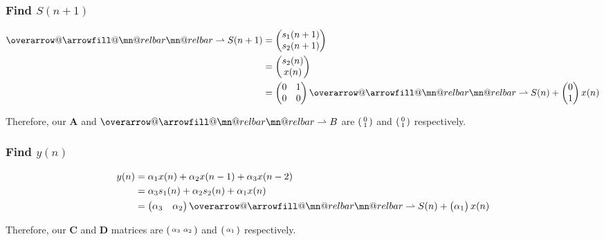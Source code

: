 \documentclass{article}
\makeatletter
\renewcommand{\thesubsubsection}{\thesection.\alph{subsection}.\Roman{subsubsection}}
\DeclareRobustCommand{\overrightharpoon}{\mathpalette{\overarrow@\rightharpoonfill@}}
\def\rightharpoonfill@{\arrowfill@\mn@relbar\mn@relbar\rightharpoonup}
\makeatother
\begin{document}
\subsubsection[~\thesubsubsection]{Find $S(n + 1)$}

\begin{align*}
	\overrightharpoon{S(n + 1)} &= \begin{pmatrix} s_1(n + 1) \\ s_2(n + 1) \end{pmatrix} \\
	&= \begin{pmatrix} s_2(n) \\ x(n) \end{pmatrix} \\
	&= \begin{pmatrix} 0 & 1 \\ 0 & 0 \end{pmatrix}\overrightharpoon{S(n)} + \begin{pmatrix} 0 \\ 1 \end{pmatrix}x(n)
\end{align*}

Therefore, our $\boldsymbol{A}$ and $\overrightharpoon{B}$ are $\begin{psmallmatrix} 0 \\ 1 \end{psmallmatrix}$ and $\begin{psmallmatrix} 0 \\ 1 \end{psmallmatrix}$ respectively.

\subsubsection[~\thesubsubsection]{Find $y(n)$}

\begin{align*}
	y(n) &= {\alpha_1}x(n) + {\alpha_2}x(n - 1) + {\alpha_3}x(n - 2) \\
	&= {\alpha_3}s_1(n) + {\alpha_2}s_2(n) + {\alpha_1}x(n) \\
	&= \begin{pmatrix} \alpha_3 & \alpha_2 \end{pmatrix}\overrightharpoon{S(n)} + \begin{pmatrix} \alpha_1 \end{pmatrix}x(n)
\end{align*}

Therefore, our $\boldsymbol{C}$ and $\boldsymbol{D}$ matrices are $\begin{psmallmatrix} \alpha_3 & \alpha_2 \end{psmallmatrix}$ and $\begin{psmallmatrix} \alpha_1 \end{psmallmatrix}$ respectively.
\end{document}
